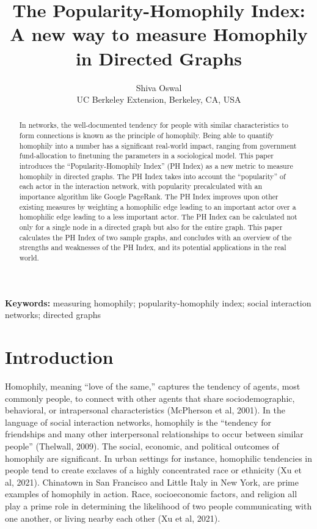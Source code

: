 \documentclass{article}
\title{The Popularity-Homophily Index: A new way to measure Homophily in
Directed Graphs}
\author{Shiva Oswal\\\normalsize
UC Berkeley Extension,
Berkeley, CA, USA}
\date{}
\begin{document}
\maketitle

\begin{abstract}
\noindent
In networks, the well-documented tendency for people with similar
characteristics to form connections is known as the principle of
homophily. Being able to quantify homophily into a number has a
significant real-world impact, ranging from government fund-allocation
to finetuning the parameters in a sociological model. This paper
introduces the ``Popularity-Homophily Index'' (PH Index) as a new metric
to measure homophily in directed graphs. The PH Index takes into account
the ``popularity'' of each actor in the interaction network, with
popularity precalculated with an importance algorithm like Google
PageRank. The PH Index improves upon other existing measures by
weighting a homophilic edge leading to an important actor over a
homophilic edge leading to a less important actor. The PH Index can be
calculated not only for a single node in a directed graph but also for
the entire graph. This paper calculates the PH Index of two sample
graphs, and concludes with an overview of the strengths and weaknesses
of the PH Index, and its potential applications in the real world.
\end{abstract}

\noindent
\textbf{Keywords:} measuring homophily; popularity-homophily index;
social interaction networks; directed graphs

\section{Introduction}

Homophily, meaning ``love of the same,'' captures the tendency of
agents, most commonly people, to connect with other agents that share
sociodemographic, behavioral, or intrapersonal characteristics
(McPherson et al, 2001). In the language of social interaction networks,
homophily is the ``tendency for friendships and many other interpersonal
relationships to occur between similar people'' (Thelwall, 2009). The
social, economic, and political outcomes of homophily are significant.
In urban settings for instance, homophilic tendencies in people tend to
create exclaves of a highly concentrated race or ethnicity (Xu et al,
2021). Chinatown in San Francisco and Little Italy in New York, are
prime examples of homophily in action. Race, socioeconomic factors, and
religion all play a prime role in determining the likelihood of two
people communicating with one another, or living nearby each other (Xu
et al, 2021).
\end{document}
